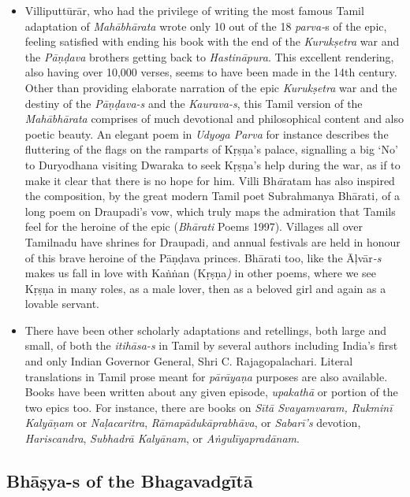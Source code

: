 \begin{itemize}
 \item Villiputtūrār, who had the privilege of writing the most famous Tamil adaptation of \textit{Mahābhārata} wrote only 10 out of the 18 \textit{parva-}s of the epic, feeling satisfied with ending his book with the end of the \textit{Kurukṣetra} war and the \textit{Pāṇḍava} brothers getting back to \textit{Hastināpura}. This excellent rendering, also having over 10,000 verses, seems to have been made in the 14th century. Other than providing elaborate narration of the epic \textit{Kurukṣetra} war and the destiny of the \textit{Pāṇḍava-s} and the \textit{Kaurava-s}, this Tamil version of the \textit{Mahābhārata} comprises of much devotional and philosophical content and also poetic beauty. An elegant poem in \textit{Udyoga Parva} for instance describes the fluttering of the flags on the ramparts of Kṛṣṇa’s palace, signalling a big ‘No’ to Duryodhana visiting Dwaraka to seek Kṛṣṇa’s help during the war, as if to make it clear that there is no hope for him. Villi Bh\textit{ā}ratam has also inspired the composition, by the great modern Tamil poet Subrahmanya Bhārati\textit{,} of a long poem on Draupadi’s vow, which truly maps the admiration that Tamils feel for the heroine of the epic (\textit{Bhārati} Poems 1997). Villages all over Tamilnadu have shrines for Draupadi\textit{,} and annual festivals are held in honour of this brave heroine of the Pāṇḍava princes. Bhārati too, like the Āļvār\textit{-s} makes us fall in love with Kaṅṅan (Kṛṣṇa\textit{)} in other poems, where we see Kṛṣṇa in many roles, as a male lover, then as a beloved girl and again as a lovable servant.

 \item There have been other scholarly adaptations and retellings, both large and small, of both the \textit{itihāsa-s} in Tamil by several authors including India’s first and only Indian Governor General, Shri C. Rajagopalachari. Literal translations in Tamil prose meant for \textit{pārāyaṇa} purposes are also available. Books have been written about any given episode, \textit{upakathā} or portion of the two epics too. For instance, there are books on \textit{Sītā Svayamvaram, Rukminī Kalyāṇam} or \textit{Naḷacaritra}, \textit{Rāmapādukāprabhāva}, or \textit{Sabarī’s} devotion, \textit{Hariscandra}, \textit{Subhadrā Kalyānam}, or \textit{Aṅgulīyapradānam}.

\end{itemize}


\subsection*{Bhāṣya-s of the Bhagavadgītā}


